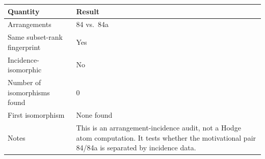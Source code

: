 \begin{tabular}{@{}p{4.6cm}p{9.2cm}@{}}
\toprule
Quantity & Result \\
\midrule
Arrangements & 84 vs.\ 84a \\
Same subset-rank fingerprint & Yes \\
Incidence-isomorphic & No \\
Number of isomorphisms found & 0 \\
First isomorphism & None found \\
Notes & This is an arrangement-incidence audit, not a Hodge atom computation. It tests whether the motivational pair 84/84a is separated by incidence data. \\
\bottomrule
\end{tabular}
